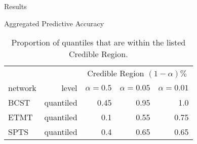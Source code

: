 \begin{chapter}{Results}
\begin{section}{Aggregated Predictive Accuracy}
    \begin{table}
      \centering
        \begin{tabular}{lrrrr}
          & & \multicolumn{3}{c}{Credible Region $(1 - \alpha)\%$} \\
          network & level & $\alpha = 0.5$ & $\alpha = 0.05$ & $\alpha = 0.01$ \\
          \hline
          BCST & quantiled & 0.45 & 0.95 & 1.0 \\
          ETMT & quantiled & 0.1 & 0.55  & 0.75 \\
          SPTS & quantiled & 0.4 & 0.65 & 0.65 \\
        \end{tabular}
      \caption{Proportion of quantiles that are within the listed Credible Region.}\label{tab:quantilecr}
    \end{table}

  \end{section}
\end{chapter}
